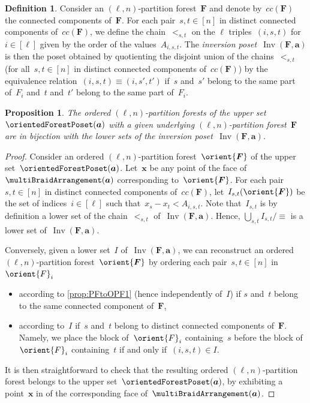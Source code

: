 \documentclass{amsart}
\newcommand{\darkblue}{\color{darkblue}} %
\newtheorem{proposition}[theorem]{Proposition}
\theoremstyle{definition}
\newtheorem{definition}[theorem]{Definition}
\renewcommand{\b}[1]{{\boldsymbol{#1}}} %
\DeclareMathOperator{\Inv}{Inv} %
\newcommand{\defn}[1]{\textsl{\darkblue #1}} %
\renewcommand{\b}[1]{\boldsymbol{#1}} %
\begin{document}
\begin{definition}
Consider an $(\ell,n)$-partition forest~$\b{F}$ and denote by~$cc(\b{F})$ the connected components of~$\b{F}$.
For each pair~$s,t \in [n]$ in distinct connected components of~$cc(\b{F})$, we define the chain~$<_{s,t}$ on the $\ell$ triples~$(i,s,t)$ for~$i \in [\ell]$ given by the order of the values~$A_{i,s,t}$.
The \defn{inversion poset}~$\Inv(\b{F}, \b{a})$ is then the poset obtained by quotienting the disjoint union of the chains~$<_{s,t}$ (for all~$s,t \in [n]$ in distinct connected components of~$cc(\b{F})$) by the equivalence relation~$(i,s,t) \equiv (i,s',t')$ if~$s$ and~$s'$ belong to the same part of~$F_i$ and~$t$ and~$t'$ belong to the same part of~$F_i$.
\end{definition}

\begin{proposition}
\label{prop:PFtoOPF2}
The ordered $(\ell,n)$-partition forests of the upper set~$\orientedForestPoset(\b{a})$ with a given underlying $(\ell,n)$-partition forest~$\b{F}$ are in bijection with the lower sets of the inversion poset~$\Inv(\b{F}, \b{a})$.
\end{proposition}

\begin{proof}
Consider an ordered $(\ell,n)$-partition forest~$\orient{\b{F}}$ of the upper set~$\orientedForestPoset(\b{a})$.
Let~$\b{x}$ be any point of the face of~$\multiBraidArrangement(\b{a})$ corresponding to~$\orient{\b{F}}$.
For each pair~$s,t \in [n]$ in distinct connected components of~$cc(\b{F})$, let~$I_{s,t}(\orient{\b{F}})$ be the set of indices~$i \in [\ell]$ such that~$x_s - x_t < A_{i,s,t}$.
Note that~$I_{s,t}$ is by definition a lower set of the chain~$<_{s,t}$ of~$\Inv(\b{F}, \b{a})$.
Hence, $\bigcup_{s,t} I_{s,t} / {\equiv}$ is a lower set of~$\Inv(\b{F}, \b{a})$.

Conversely, given a lower set~$I$ of~$\Inv(\b{F}, \b{a})$, we can reconstruct an ordered $(\ell,n)$-partition forest~$\orient{\b{F}}$ by ordering each pair~$s,t \in [n]$ in~$\orient{F}_i$ 
\begin{itemize}
\item according to \cref{prop:PFtoOPF1} (hence independently of~$I$) if $s$ and~$t$ belong to the same connected component of~$\b{F}$,
\item according to~$I$ if~$s$ and~$t$ belong to distinct connected components of~$\b{F}$. Namely, we place the block of~$\orient{F}_i$ containing~$s$ before the block of~$\orient{F}_i$ containing~$t$ if and only if~$(i,s,t) \in I$.
\end{itemize}
It is then straightforward to check that the resulting ordered $(\ell,n)$-partition forest belongs to the upper set~$\orientedForestPoset(\b{a})$, by exhibiting a point~$\b{x}$ in of the corresponding face of~$\multiBraidArrangement(\b{a})$.
\end{proof}
\end{document}
